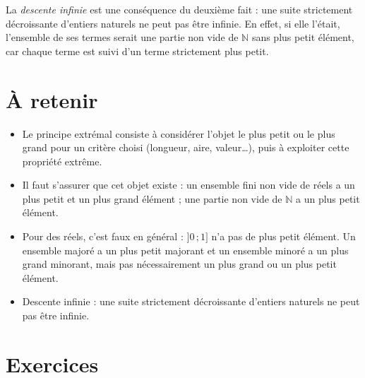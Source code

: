 \documentclass[11pt]{article}
\begin{document}
\begin{remarque}
La \emph{descente infinie} est une conséquence du deuxième fait : une suite strictement décroissante d'entiers naturels ne peut pas être infinie. En effet, si elle l'était, l'ensemble de ses termes serait une partie non vide de $\mathbb{N}$ sans plus petit élément, car chaque terme est suivi d'un terme strictement plus petit.
\end{remarque}

\section{À retenir}\label{sec:retenir}

\begin{retenir}
\begin{itemize}
	\item Le principe extrémal consiste à considérer l'objet le plus petit ou le plus grand pour un critère choisi (longueur, aire, valeur\ldots), puis à exploiter cette propriété extrême.
	\item Il faut s'assurer que cet objet existe : un ensemble fini non vide de réels a un plus petit et un plus grand élément ; une partie non vide de $\mathbb{N}$ a un plus petit élément.
	\item Pour des réels, c'est faux en général : $]0\,;1]$ n'a pas de plus petit élément. Un ensemble majoré a un plus petit majorant et un ensemble minoré a un plus grand minorant, mais pas nécessairement un plus grand ou un plus petit élément.
	\item Descente infinie : une suite strictement décroissante d'entiers naturels ne peut pas être infinie.
\end{itemize}
\end{retenir}

\section{Exercices}\label{sec:exercices}

\end{document}
